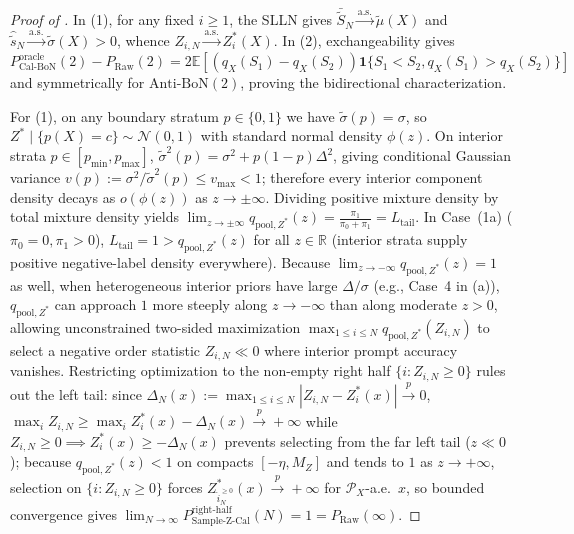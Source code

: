 \documentclass[10pt]{article}
\theoremstyle{plain}
\theoremstyle{definition}
\theoremstyle{remark}
\newcommand{\R}{\mathbb{R}}
\newcommand{\E}{\mathbb{E}}
\newcommand{\ind}{\mathbf{1}}
\begin{document}
\begin{proof}[Proof of ]
In (1), for any fixed $i \ge 1$, the SLLN gives $\bar{\tilde{S}}_N \xrightarrow{\mathrm{a.s.}} \tilde{\mu}(X)$ and $\hat{\tilde{s}}_N \xrightarrow{\mathrm{a.s.}} \tilde{\sigma}(X) > 0$, whence $Z_{i,N} \xrightarrow{\mathrm{a.s.}} Z_i^*(X)$. In (2), exchangeability gives $P_{\mathrm{Cal\text{-}BoN}}^{\mathrm{oracle}}(2) - P_{\mathrm{Raw}}(2) = 2\E[(q_X(S_1)-q_X(S_2))\ind\{S_1<S_2, q_X(S_1)>q_X(S_2)\}]$ and symmetrically for $\mathrm{Anti\text{-}BoN}(2)$, proving the bidirectional characterization.

For (1), on any boundary stratum $p \in \{0,1\}$ we have $\tilde{\sigma}(p) = \sigma$, so $Z^* \mid \{p(X)=c\} \sim \mathcal{N}(0, 1)$ with standard normal density $\phi(z)$. On interior strata $p \in [p_{\min}, p_{\max}]$, $\tilde{\sigma}^2(p) = \sigma^2 + p(1-p)\Delta^2$, giving conditional Gaussian variance $v(p) := \sigma^2 / \tilde{\sigma}^2(p) \le v_{\max} < 1$; therefore every interior component density decays as $o(\phi(z))$ as $z \to \pm\infty$. Dividing positive mixture density by total mixture density yields $\lim_{z\to\pm\infty} q_{\mathrm{pool}, Z^*}(z) = \frac{\pi_1}{\pi_0 + \pi_1} = L_{\mathrm{tail}}$.
In Case~(1a) ($\pi_0 = 0, \pi_1 > 0$), $L_{\mathrm{tail}} = 1 > q_{\mathrm{pool}, Z^*}(z)$ for all $z \in \R$ (interior strata supply positive negative-label density everywhere). Because $\lim_{z\to -\infty} q_{\mathrm{pool}, Z^*}(z) = 1$ as well, when heterogeneous interior priors have large $\Delta/\sigma$ (e.g., Case~4 in (a)), $q_{\mathrm{pool}, Z^*}$ can approach $1$ more steeply along $z \to -\infty$ than along moderate $z > 0$, allowing unconstrained two-sided maximization $\max_{1\le i\le N} q_{\mathrm{pool}, Z^*}(Z_{i,N})$ to select a negative order statistic $Z_{i,N} \ll 0$ where interior prompt accuracy vanishes. Restricting optimization to the non-empty right half $\{i : Z_{i,N} \ge 0\}$ rules out the left tail: since $\Delta_N(x) := \max_{1\le i\le N}|Z_{i,N} - Z_i^*(x)| \xrightarrow{p} 0$, $\max_i Z_{i,N} \ge \max_i Z_i^*(x) - \Delta_N(x) \xrightarrow{p} +\infty$ while $Z_{i,N} \ge 0 \implies Z_i^*(x) \ge -\Delta_N(x)$ prevents selecting from the far left tail ($z \ll 0$); because $q_{\mathrm{pool}, Z^*}(z) < 1$ on compacts $[-\eta, M_Z]$ and tends to $1$ as $z \to +\infty$, selection on $\{i : Z_{i,N} \ge 0\}$ forces $Z_{\hat{i}_N^{\ge 0}}^*(x) \xrightarrow{p} +\infty$ for $\mathcal{P}_X$-a.e.\ $x$, so bounded convergence gives $\lim_{N\to\infty} P_{\mathrm{Sample\text{-}Z\text{-}Cal}}^{\mathrm{right\text{-}half}}(N) = 1 = P_{\mathrm{Raw}}(\infty)$.

\end{proof}
\end{document}
